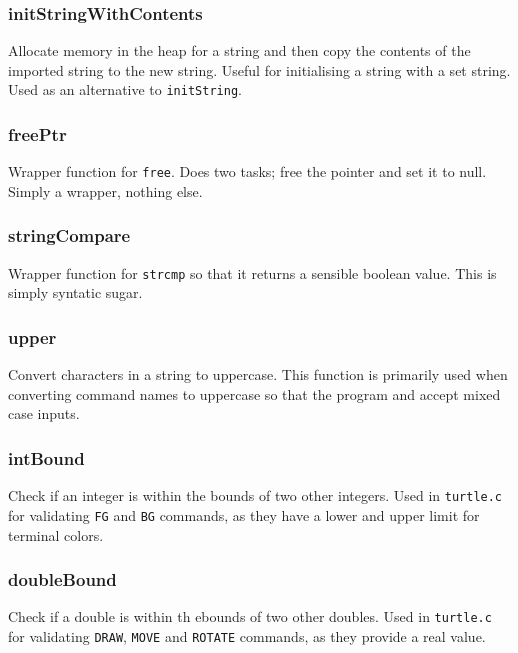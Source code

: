 \documentclass[a4paper, 12pt, titlepage]{article}
\newcommand{\code}[1]{\small\texttt{#1}\normalsize}
\begin{document}
\subsubsection{initStringWithContents}

Allocate memory in the heap for a string and then copy the contents of the
imported string to the new string. Useful for initialising a string with a
set string. Used as an alternative to \code{initString}.

\subsubsection{freePtr}

Wrapper function for \code{free}. Does two tasks; free the pointer and
set it to null. Simply a wrapper, nothing else.

\subsubsection{stringCompare}

Wrapper function for \code{strcmp} so that it returns a sensible boolean
value. This is simply syntatic sugar.

\subsubsection{upper}

Convert characters in a string to uppercase. This function is primarily
used when converting command names to uppercase so that the program and
accept mixed case inputs.

\subsubsection{intBound}

Check if an integer is within the bounds of two other integers. Used in
\code{turtle.c} for validating \code{FG} and \code{BG} commands, as they
have a lower and upper limit for terminal colors.

\subsubsection{doubleBound}

Check if a double is within th ebounds of two other doubles. Used in
\code{turtle.c} for validating \code{DRAW}, \code{MOVE} and \code{ROTATE}
commands, as they provide a real value.
\end{document}
